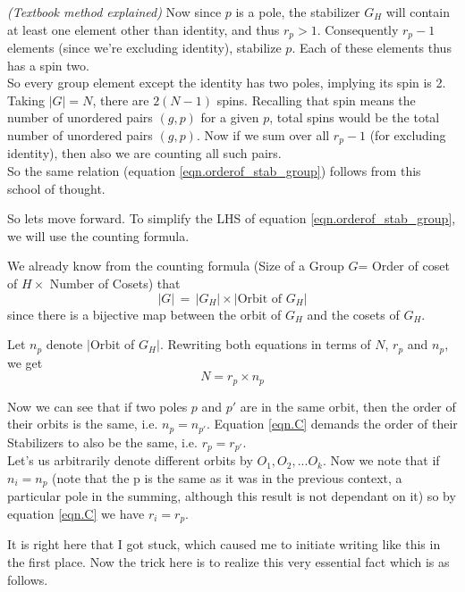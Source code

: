 \par
\emph{(Textbook method explained)}
Now since $p$ is a pole, the stabilizer $G_{H}$ will contain at least one element other than identity, and thus $r_{p}>1$. Consequently $r_{p}-1$ elements (since we're excluding identity), stabilize $p$. Each of these elements thus has a spin two.\\
So every group element except the identity has two poles, implying its spin is 2. Taking $|G|=N$, there are $2(N-1)$ spins. Recalling that spin means the number of unordered pairs $(g,p)$ for a given $p$, total spins would be the total number of unordered pairs $(g,p)$. Now if we sum over all $r_{p} - 1$ (for excluding identity), then also we are counting all such pairs.\\
So the same relation (equation \ref{eqn.orderof_stab_group}) follows from this school of thought.\\
\par
So lets move forward. To simplify the LHS of equation \ref{eqn.orderof_stab_group}, we will use the counting formula.
\par
We already know from the counting formula (Size of a Group $G$= Order of coset of $H \times$ Number of Cosets) that
\begin{equation}
|G| \, = \, |G_{H}| \times | \text{Orbit of } G_{H}|
\label{eqn.B}
\end{equation}
since there is a bijective map between the orbit of $G_{H}$ and the cosets of $G_{H}$.
\par
Let $n_{p}$ denote $|$Orbit of $G_{H}|$. Rewriting both equations in terms of $N$, $r_{p}$ and $n_{p}$, we get\\
\begin{equation}
N=r_{p} \times n_{p}
\label{eqn.C}
\end{equation}
\par
Now we can see that if two poles $p$ and $p'$ are in the same orbit, then the order of their orbits is the same, i.e. $n_{p} =n_{p'}$. Equation \ref{eqn.C} demands the order of their Stabilizers to also be the same, i.e. $r_{p}=r_{p'}$.\\
Let's us arbitrarily denote different orbits by $O_{1}, O_{2}, ... O_{k}$. Now we note that if $n_{i}=n_{p}$ (note that the p is the same as it was in the previous context, a particular pole in the summing, although this result is not dependant on it) so by equation \ref{eqn.C} we have $r_{i}=r_{p}$.
\par
It is right here that I got stuck, which caused me to initiate writing like this in the first place. Now the trick here is to realize this very essential fact which is as follows.\\

